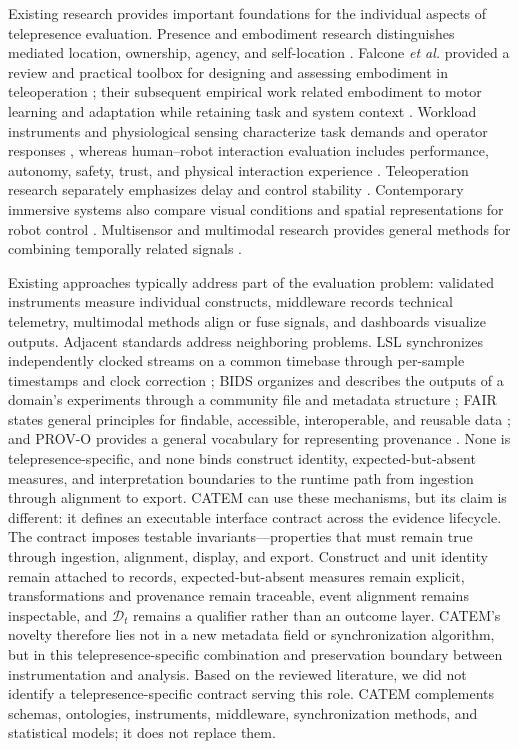 \documentclass[letterpaper,10pt,conference]{ieeeconf}
\begin{document}
Existing research provides important foundations for the individual aspects of telepresence evaluation. Presence and embodiment research distinguishes mediated location, ownership, agency, and self-location \cite{slater1997,kilteni2012}. Falcone \emph{et al.} provided a review and practical toolbox for designing and assessing embodiment in teleoperation \cite{falcone2023}; their subsequent empirical work related embodiment to motor learning and adaptation while retaining task and system context \cite{falcone2024}. Workload instruments and physiological sensing characterize task demands and operator responses \cite{hart1988,meehan2002}, whereas human--robot interaction evaluation includes performance, autonomy, safety, trust, and physical interaction experience \cite{steinfeld2006,goodrich2008,seifi2024}. Teleoperation research separately emphasizes delay and control stability \cite{hokayem2006}. Contemporary immersive systems also compare visual conditions and spatial representations for robot control \cite{gloumeau2024}. Multisensor and multimodal research provides general methods for combining temporally related signals \cite{hall1997,baltrusaitis2019}.

Existing approaches typically address part of the evaluation problem: validated instruments measure individual constructs, middleware records technical telemetry, multimodal methods align or fuse signals, and dashboards visualize outputs. Adjacent standards address neighboring problems. LSL synchronizes independently clocked streams on a common timebase through per-sample timestamps and clock correction \cite{kothe2025}; BIDS organizes and describes the outputs of a domain's experiments through a community file and metadata structure \cite{gorgolewski2016}; FAIR states general principles for findable, accessible, interoperable, and reusable data \cite{wilkinson2016}; and PROV-O provides a general vocabulary for representing provenance \cite{lebo2013}. None is telepresence-specific, and none binds construct identity, expected-but-absent measures, and interpretation boundaries to the runtime path from ingestion through alignment to export. CATEM can use these mechanisms, but its claim is different: it defines an executable interface contract across the evidence lifecycle. The contract imposes testable invariants---properties that must remain true through ingestion, alignment, display, and export. Construct and unit identity remain attached to records, expected-but-absent measures remain explicit, transformations and provenance remain traceable, event alignment remains inspectable, and $\mathcal{D}_{t}$ remains a qualifier rather than an outcome layer. CATEM's novelty therefore lies not in a new metadata field or synchronization algorithm, but in this telepresence-specific combination and preservation boundary between instrumentation and analysis. Based on the reviewed literature, we did not identify a telepresence-specific contract serving this role. CATEM complements schemas, ontologies, instruments, middleware, synchronization methods, and statistical models; it does not replace them.
\end{document}
